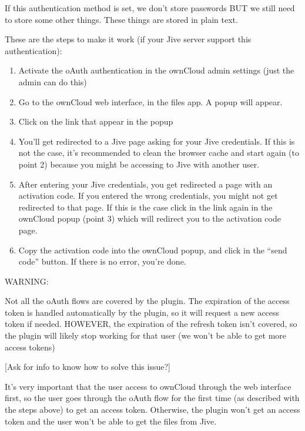 \documentclass[letterpaper,10pt,english]{sphinxmanual}
\begin{document}
If this authentication method is set, we don't store passwords BUT we still need to store some other things. These things are stored in plain text.

These are the steps to make it work (if your Jive server support this authentication):
\begin{enumerate}
\item {} 
Activate the oAuth authentication in the ownCloud admin settings (just the admin can do this)

\item {} 
Go to the ownCloud web interface, in the files app. A popup will appear.

\item {} 
Click on the link that appear in the popup

\item {} 
You'll get redirected to a Jive page asking for your Jive credentials. If this is not the case, it's recommended
to clean the browser cache and start again (to point 2) because you might be accessing to Jive with another user.

\item {} 
After entering your Jive credentials, you get redirected a page with an activation code. If you entered the
wrong credentials, you might not get redirected to that page. If this is the case click
in the link again in the ownCloud popup (point 3) which will redirect you to the activation code page.

\item {} 
Copy the activation code into the ownCloud popup,
and click in the “send code” button. If there is no error, you're done.

\end{enumerate}

WARNING:

Not all the oAuth flows are covered by the plugin. The expiration of the access token is handled automatically by
the plugin, so it will request a new access token if needed. HOWEVER, the expiration of the refresh token isn't
covered, so the plugin will likely stop working for that user (we won't be able to get more access tokens)

{[}Ask for info to know how to solve this issue?{]}

It's very important that the user access to ownCloud through the web interface first, so the user goes through
the oAuth flow for the first time (as described with the steps above) to get an access token. Otherwise, the
plugin won't get an access token and the user won't be able to get the files from Jive.
\end{document}
